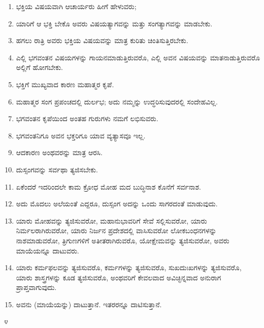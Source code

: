 \begin{enumerate}
\item ಭಕ್ತಿಯ ವಿಷಯವಾಗಿ ಆಚಾರ್ಯರು ಹೀಗೆ ಹೇಳುವರು;

 \item ಯಾರಿಗೆ ಆ ಭಕ್ತಿ ಬೇಕೊ ಅವರು ವಿಷಯತ್ಯಾಗವನ್ನು ಮತ್ತು ಸಂಗತ್ಯಾಗವನ್ನು ಮಾಡಬೇಕು.

 \item ಹಗಲು ರಾತ್ರಿ ಅವರು ಭಕ್ತಿಯ ವಿಷಯವನ್ನು ಮಾತ್ರ ಕುರಿತು ಚಿಂತಿಸುತ್ತಿರಬೇಕು.

 \item ಎಲ್ಲಿ ಭಗವಂತನ ವಿಷಯಗಳನ್ನು ಗಾಯನಮಾಡುತ್ತಿರುವರೊ, ಎಲ್ಲಿ ಅವನ ವಿಷಯವನ್ನು ಮಾತನಾಡುತ್ತಿರುವರೊ ಅಲ್ಲಿಗೆ ಹೋಗಬೇಕು.

 \item ಭಕ್ತಿಗೆ ಮುಖ್ಯವಾದ ಕಾರಣ ಮಹಾತ್ಮರ ಕೃಪೆ.

 \item ಮಹಾತ್ಮರ ಸಂಗ ಪ್ರಪಂಚದಲ್ಲಿ ದುರ್ಲಭ; ಅದು ನಮ್ಮನ್ನು ಉದ್ಧರಿಸುವುದರಲ್ಲಿ ಸಂದೇಹವಿಲ್ಲ.

 \item ಭಗವಂತನ ಕೃಪೆಯಿಂದ ಅಂತಹ ಗುರುಗಳು ನಮಗೆ ಲಭಿಸುವರು.

 \item ಭಗವಂತನಿಗೂ ಅವನ ಭಕ್ತರಿಗೂ ಯಾವ ವ್ಯತ್ಯಾಸವೂ ಇಲ್ಲ.

 \item ಆದಕಾರಣ ಅಂಥವರನ್ನು ಮಾತ್ರ ಆರಸಿ.

 \item ದುಸ್ಸಂಗವನ್ನು ಸರ್ವಥಾ ತ್ಯಜಿಸಬೇಕು.

 \item ಏಕೆಂದರೆ ಇದರಿಂದಲೇ ಕಾಮ ಕ್ರೋಧ ಮೋಹ ಮದ ಬುದ್ಧಿನಾಶ ಕೊನೆಗೆ ಸರ್ವನಾಶ.

 \item ಅದು ಮೊದಲು ಅಲೆಯಂತೆ ಎದ್ದರೂ, ದುಸ್ಸಂಗ ಅದನ್ನು ಒಂದು ಸಾಗರದಂತೆ ಮಾಡುವುದು.

 \item ಯಾರು ಮೋಹವನ್ನು ತ್ಯಜಿಸುವರೋ, ಮಹಾನುಭಾವರಿಗೆ ಸೇವೆ ಸಲ್ಲಿಸುವರೋ, ಯಾರು ನಿರ್ಮಲರಾಗಿರುವರೋ, ಯಾರು ನಿರ್ಜನ ಪ್ರದೇಶದಲ್ಲಿ ವಾಸಿಸುವರೋ ಲೋಕಬಂಧನಗಳನ್ನು ನಾಶಮಾಡುವರೋ, ತ್ರಿಗುಣಗಳಿಗೆ ಅತೀತರಾಗಿರುವರೊ, ಯೋಕ್ಷೇಮವನ್ನು ತ್ಯಜಿಸುವರೋ, ಅವರು ಮಾಯೆಯನ್ನೂ ದಾಟುವರು.

 \item ಯಾರು ಕರ್ಮಫಲವನ್ನು ತ್ಯಜಿಸುವರೊ, ಕರ್ಮಗಳನ್ನು ತ್ಯಜಿಸುವರೊ, ಸುಖದುಃಖಗಳನ್ನು ತ್ಯಜಿಸುವರೊ, ಯಾರು ಶಾಸ್ತ್ರಗಳನ್ನು ಕೂಡ ತ್ಯಜಿಸುವರೊ, ಅಂಥವರಿಗೆ ಕೇವಲವಾದ ಅವಿಚ್ಛಿನ್ನವಾದ ಅನುರಾಗ ಪ್ರಾಪ್ತವಾಗುವುದು.

 \item ಅವನು (ಮಾಯೆಯನ್ನು) ದಾಟುತ್ತಾನೆ. ಇತರರನ್ನೂ ದಾಟಿಸುತ್ತಾನೆ.

\end{enumerate}

\begin{center}
೪
\end{center}

